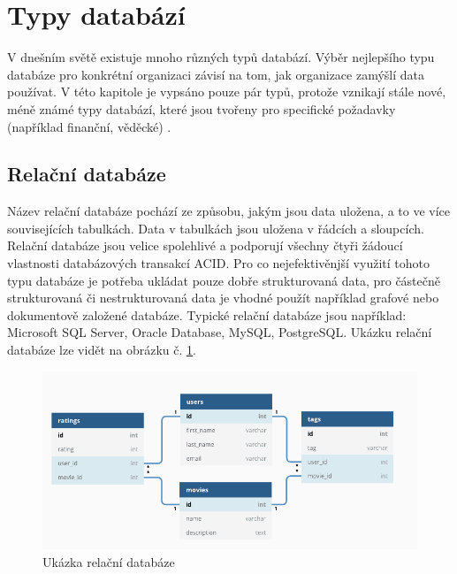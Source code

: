 \section{Typy databází}
V dnešním světě existuje mnoho různých typů databází. Výběr nejlepšího typu databáze pro konkrétní organizaci závisí na tom, jak organizace zamýšlí data používat. V této kapitole je vypsáno pouze pár typů, protože vznikají stále nové, méně známé typy databází, které jsou tvořeny pro specifické požadavky (například finanční, věděcké) \cite{matillionTypeDB, OracleDB}.
\subsection{Relační databáze}
Název relační databáze pochází ze způsobu, jakým jsou data uložena, a to ve více souvisejících tabulkách. Data v tabulkách jsou uložena v řádcích a sloupcích. Relační databáze jsou velice spolehlivé a podporují všechny čtyři žádoucí vlastnosti databázových transakcí \gls{ACID}. Pro co nejefektivěnjší využití tohoto typu databáze je potřeba ukládat pouze dobře strukturovaná data, pro částečně strukturovaná či nestrukturovaná data je vhodné použít například grafové nebo dokumentově založené databáze. Typické relační databáze jsou například: Microsoft SQL Server, Oracle Database, MySQL, PostgreSQL. Ukázku relační databáze lze vidět na obrázku č. \ref{fig:db_img_relational}.
	\begin{figure}[H]
	\centering
	\includegraphics[width=14cm]{img/databaze/relational_db}
	\caption{Ukázka relační databáze}
	\label{fig:db_img_relational}
	\end{figure}
